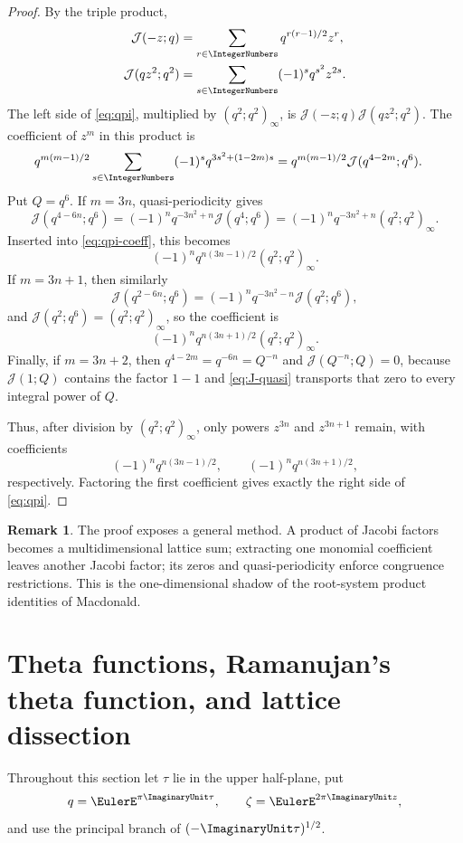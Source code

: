 \documentclass[11pt,oneside]{article}
\theoremstyle{definition}
\newtheorem{remark}[theorem]{Remark}
\newcommand{\J}{\mathcal J}
\begin{document}
\begin{proof}
By the triple product,
\begin{align*}
 \J(-z;q)&=\sum_{r\in\IntegerNumbers}q^{r(r-1)/2}z^r,\\
 \J(qz^2;q^2)&=\sum_{s\in\IntegerNumbers}(-1)^sq^{s^2}z^{2s}.
\end{align*}
The left side of \eqref{eq:qpi}, multiplied by $(q^2;q^2)_\infty$, is
$\J(-z;q)\J(qz^2;q^2)$. The coefficient of $z^m$ in this product is
\begin{align}
 q^{m(m-1)/2}\sum_{s\in\IntegerNumbers}(-1)^s
 q^{3s^2+(1-2m)s}
 &=q^{m(m-1)/2}\J(q^{4-2m};q^6).
\label{eq:qpi-coeff}
\end{align}
Put $Q=q^6$. If $m=3n$, quasi-periodicity gives
\[
 \J(q^{4-6n};q^6)
 =(-1)^nq^{-3n^2+n}\J(q^4;q^6)
 =(-1)^nq^{-3n^2+n}(q^2;q^2)_\infty.
\]
Inserted into \eqref{eq:qpi-coeff}, this becomes
\[
 (-1)^nq^{n(3n-1)/2}(q^2;q^2)_\infty.
\]
If $m=3n+1$, then similarly
\[
 \J(q^{2-6n};q^6)
 =(-1)^nq^{-3n^2-n}\J(q^2;q^6),
\]
and $\J(q^2;q^6)=(q^2;q^2)_\infty$, so the coefficient is
\[
 (-1)^nq^{n(3n+1)/2}(q^2;q^2)_\infty.
\]
Finally, if $m=3n+2$, then $q^{4-2m}=q^{-6n}=Q^{-n}$ and
$\J(Q^{-n};Q)=0$, because $\J(1;Q)$ contains the factor $1-1$ and
\eqref{eq:J-quasi} transports that zero to every integral power of $Q$.

Thus, after division by $(q^2;q^2)_\infty$, only powers $z^{3n}$ and
$z^{3n+1}$ remain, with coefficients
\[
 (-1)^nq^{n(3n-1)/2},\qquad
 (-1)^nq^{n(3n+1)/2},
\]
respectively. Factoring the first coefficient gives exactly the right side of
\eqref{eq:qpi}.
\end{proof}

\begin{remark}
The proof exposes a general method. A product of Jacobi factors becomes a multidimensional lattice sum; extracting one monomial coefficient leaves another Jacobi factor; its zeros and quasi-periodicity enforce congruence restrictions. This is the one-dimensional shadow of the root-system product identities of Macdonald.
\end{remark}


\section{Theta functions, Ramanujan's theta function, and lattice dissection}

Throughout this section let $\tau$ lie in the upper half-plane, put
\[
 q=\EulerE^{\pi\ImaginaryUnit\tau},\qquad \zeta=\EulerE^{2\pi\ImaginaryUnit z},
\]
and use the principal branch of $(-\ImaginaryUnit\tau)^{1/2}$.
\end{document}
